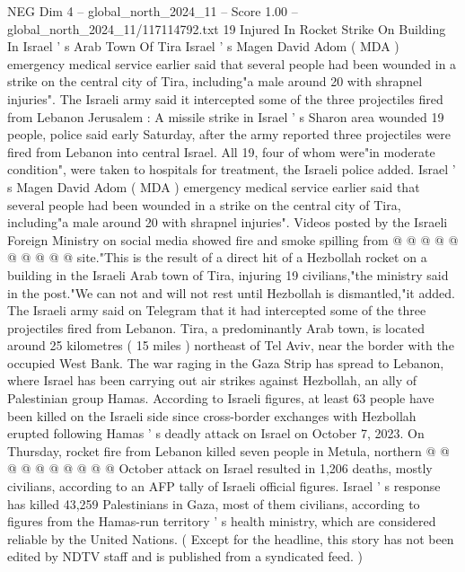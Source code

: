 \begin{textsample}{NEG Dim 4 – global\_north\_2024\_11 – Score 1.00 – global\_north\_2024\_11/117114792.txt}  \label{ex:f4_neg_173}
19 Injured In Rocket Strike On Building In Israel ' s Arab Town Of Tira Israel ' s Magen David Adom ( MDA ) emergency medical service earlier said that several people had been wounded in a strike on the central city of Tira, including"a male around 20 with shrapnel injuries".
The Israeli army said it intercepted some of the three projectiles fired from Lebanon Jerusalem : A missile strike in Israel ' s Sharon area wounded 19 people, police said early Saturday, after the army reported three projectiles were fired from Lebanon into central Israel.
All 19, four of whom were"in moderate condition", were taken to hospitals for treatment, the Israeli police added.
Israel ' s Magen David Adom ( MDA ) emergency medical service earlier said that several people had been wounded in a strike on the central city of Tira, including"a male around 20 with shrapnel injuries".
Videos posted by the Israeli Foreign Ministry on social media showed fire and smoke spilling from @ @ @ @ @ @ @ @ @ @ site."This is the result of a direct hit of a Hezbollah rocket on a building in the Israeli Arab town of Tira, injuring 19 civilians,"the ministry said in the post."We can not and will not rest until Hezbollah is dismantled,"it added.
The Israeli army said on Telegram that it had intercepted some of the three projectiles fired from Lebanon.
Tira, a predominantly Arab town, is located around 25 kilometres ( 15 miles ) northeast of Tel Aviv, near the border with the occupied West Bank.
The war raging in the Gaza Strip has spread to Lebanon, where Israel has been carrying out air strikes against Hezbollah, an ally of Palestinian group Hamas.
According to Israeli figures, at least 63 people have been killed on the Israeli side since cross-border exchanges with Hezbollah erupted following Hamas ' s deadly attack on Israel on October 7, 2023.
On Thursday, rocket fire from Lebanon killed seven people in Metula, northern @ @ @ @ @ @ @ @ @ @ October attack on Israel resulted in 1,206 deaths, mostly civilians, according to an AFP tally of Israeli official figures.
Israel ' s response has killed 43,259 Palestinians in Gaza, most of them civilians, according to figures from the Hamas-run territory ' s health ministry, which are considered reliable by the United Nations. ( Except for the headline, this story has not been edited by NDTV staff and is published from a syndicated feed. )

\end{textsample}
